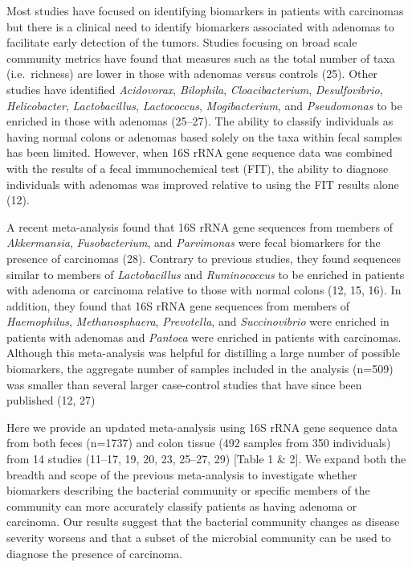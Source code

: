 \documentclass[12pt,]{article}
\begin{document}
Most studies have focused on identifying biomarkers in patients with
carcinomas but there is a clinical need to identify biomarkers
associated with adenomas to facilitate early detection of the tumors.
Studies focusing on broad scale community metrics have found that
measures such as the total number of taxa (i.e.~richness) are lower in
those with adenomas versus controls (25). Other studies have identified
\emph{Acidovorax}, \emph{Bilophila}, \emph{Cloacibacterium},
\emph{Desulfovibrio}, \emph{Helicobacter}, \emph{Lactobacillus},
\emph{Lactococcus}, \emph{Mogibacterium}, and \emph{Pseudomonas} to be
enriched in those with adenomas (25--27). The ability to classify
individuals as having normal colons or adenomas based solely on the taxa
within fecal samples has been limited. However, when 16S rRNA gene
sequence data was combined with the results of a fecal immunochemical
test (FIT), the ability to diagnose individuals with adenomas was
improved relative to using the FIT results alone (12).

A recent meta-analysis found that 16S rRNA gene sequences from members
of \emph{Akkermansia}, \emph{Fusobacterium}, and \emph{Parvimonas} were
fecal biomarkers for the presence of carcinomas (28). Contrary to
previous studies, they found sequences similar to members of
\emph{Lactobacillus} and \emph{Ruminococcus} to be enriched in patients
with adenoma or carcinoma relative to those with normal colons (12, 15,
16). In addition, they found that 16S rRNA gene sequences from members
of \emph{Haemophilus}, \emph{Methanosphaera}, \emph{Prevotella}, and
\emph{Succinovibrio} were enriched in patients with adenomas and
\emph{Pantoea} were enriched in patients with carcinomas. Although this
meta-analysis was helpful for distilling a large number of possible
biomarkers, the aggregate number of samples included in the analysis
(n=509) was smaller than several larger case-control studies that have
since been published (12, 27)

Here we provide an updated meta-analysis using 16S rRNA gene sequence
data from both feces (n=1737) and colon tissue (492 samples from 350
individuals) from 14 studies (11--17, 19, 20, 23, 25--27, 29) {[}Table 1
\& 2{]}. We expand both the breadth and scope of the previous
meta-analysis to investigate whether biomarkers describing the bacterial
community or specific members of the community can more accurately
classify patients as having adenoma or carcinoma. Our results suggest
that the bacterial community changes as disease severity worsens and
that a subset of the microbial community can be used to diagnose the
presence of carcinoma.
\end{document}
